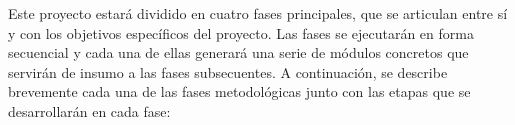 
Este proyecto estará dividido en cuatro fases principales, que se articulan entre sí y con los objetivos específicos del proyecto. Las fases se ejecutarán en forma secuencial y cada una de ellas generará una serie de módulos concretos que servirán de insumo a las fases subsecuentes. A continuación, se describe brevemente cada una de las fases metodológicas junto con las etapas que se desarrollarán en cada fase: